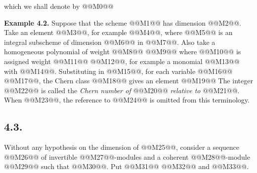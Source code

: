 
which we shall denote by
@@M0@@

\textbf{Example 4.2.} Suppose that the scheme @@M1@@ has dimension @@M2@@. Take an element @@M3@@, for example @@M4@@, where @@M5@@ is an integral subscheme of dimension @@M6@@ in @@M7@@. Also take a homogeneous polynomial of weight @@M8@@
@@M9@@
where @@M10@@ is assigned weight @@M11@@ @@M12@@, for example a monomial @@M13@@ with @@M14@@. Substituting in @@M15@@, for each variable @@M16@@ @@M17@@, the Chern class
@@M18@@
gives an element
@@M19@@
The integer
@@M22@@
is called the \emph{Chern number of} @@M20@@ \emph{relative to} @@M21@@.
When @@M23@@, the reference to @@M24@@ is omitted from this terminology.

\subsection*{4.3.}
Without any hypothesis on the dimension of @@M25@@, consider a sequence @@M26@@ of invertible @@M27@@-modules and a coherent @@M28@@-module @@M29@@ such that @@M30@@. Put @@M31@@ @@M32@@ and @@M33@@.

